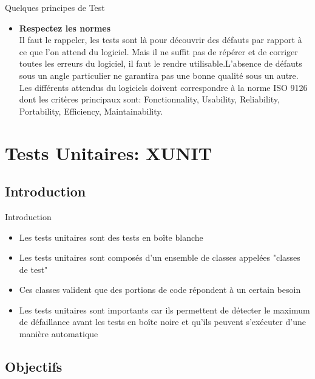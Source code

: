 \documentclass{beamer}
\begin{document}
\begin{frame}{Quelques principes de Test}
  \begin{itemize}
  \item{{\bfseries Respectez les normes}
 \\Il faut le rappeler, les tests sont là pour découvrir des défauts par rapport à ce que l'on attend du logiciel. Mais il ne suffit pas  de répérer et de corriger toutes les erreurs du logiciel, il faut le rendre utilisable.L'absence de défauts sous un angle particulier ne garantira pas une bonne qualité sous un autre. Les différents attendus du logiciels doivent correspondre à la norme ISO 9126 dont les critères principaux sont: Fonctionnality, Usability, Reliability, Portability, Efficiency, Maintainability.}
    
\end{itemize} 
\end{frame}


\section{Tests Unitaires: XUNIT}

\subsection{Introduction}

\begin{frame}{Introduction}
  \begin{itemize}
    
  \item{Les tests unitaires sont des tests en boîte blanche}
  \item{Les tests unitaires sont composés d'un ensemble de classes appelées "{\color{blue}classes de test}"}
  \item{Ces classes valident que des portions de code répondent à un certain besoin}
  \item{Les tests unitaires sont importants car ils permettent de détecter le maximum de défaillance avant les tests en boîte noire et qu'ils peuvent s'exécuter d'une manière automatique}
    
  \end{itemize}   
\end{frame}

\subsection{Objectifs}
\end{document}
